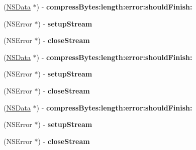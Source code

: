 \begin{DoxyCompactItemize}
\item 
\hypertarget{interface_a_s_i_data_compressor_a2190fb1c48f0fcc0a68fecbf04552f8c}{
(\hyperlink{class_n_s_data}{\-N\-S\-Data} $\ast$) -\/ {\bfseries compress\-Bytes\-:length\-:error\-:should\-Finish\-:}}
\label{interface_a_s_i_data_compressor_a2190fb1c48f0fcc0a68fecbf04552f8c}

\item 
\hypertarget{interface_a_s_i_data_compressor_af1a40ec1ac24132c7349fc0658639dfa}{
(\-N\-S\-Error $\ast$) -\/ {\bfseries setup\-Stream}}
\label{interface_a_s_i_data_compressor_af1a40ec1ac24132c7349fc0658639dfa}

\item 
\hypertarget{interface_a_s_i_data_compressor_a51d7144538df7dd6a6a19f91f9bfe298}{
(\-N\-S\-Error $\ast$) -\/ {\bfseries close\-Stream}}
\label{interface_a_s_i_data_compressor_a51d7144538df7dd6a6a19f91f9bfe298}

\item 
\hypertarget{interface_a_s_i_data_compressor_a2190fb1c48f0fcc0a68fecbf04552f8c}{
(\hyperlink{class_n_s_data}{\-N\-S\-Data} $\ast$) -\/ {\bfseries compress\-Bytes\-:length\-:error\-:should\-Finish\-:}}
\label{interface_a_s_i_data_compressor_a2190fb1c48f0fcc0a68fecbf04552f8c}

\item 
\hypertarget{interface_a_s_i_data_compressor_af1a40ec1ac24132c7349fc0658639dfa}{
(\-N\-S\-Error $\ast$) -\/ {\bfseries setup\-Stream}}
\label{interface_a_s_i_data_compressor_af1a40ec1ac24132c7349fc0658639dfa}

\item 
\hypertarget{interface_a_s_i_data_compressor_a51d7144538df7dd6a6a19f91f9bfe298}{
(\-N\-S\-Error $\ast$) -\/ {\bfseries close\-Stream}}
\label{interface_a_s_i_data_compressor_a51d7144538df7dd6a6a19f91f9bfe298}

\item 
\hypertarget{interface_a_s_i_data_compressor_a2190fb1c48f0fcc0a68fecbf04552f8c}{
(\hyperlink{class_n_s_data}{\-N\-S\-Data} $\ast$) -\/ {\bfseries compress\-Bytes\-:length\-:error\-:should\-Finish\-:}}
\label{interface_a_s_i_data_compressor_a2190fb1c48f0fcc0a68fecbf04552f8c}

\item 
\hypertarget{interface_a_s_i_data_compressor_af1a40ec1ac24132c7349fc0658639dfa}{
(\-N\-S\-Error $\ast$) -\/ {\bfseries setup\-Stream}}
\label{interface_a_s_i_data_compressor_af1a40ec1ac24132c7349fc0658639dfa}

\item 
\hypertarget{interface_a_s_i_data_compressor_a51d7144538df7dd6a6a19f91f9bfe298}{
(\-N\-S\-Error $\ast$) -\/ {\bfseries close\-Stream}}
\label{interface_a_s_i_data_compressor_a51d7144538df7dd6a6a19f91f9bfe298}


\end{DoxyCompactItemize}
